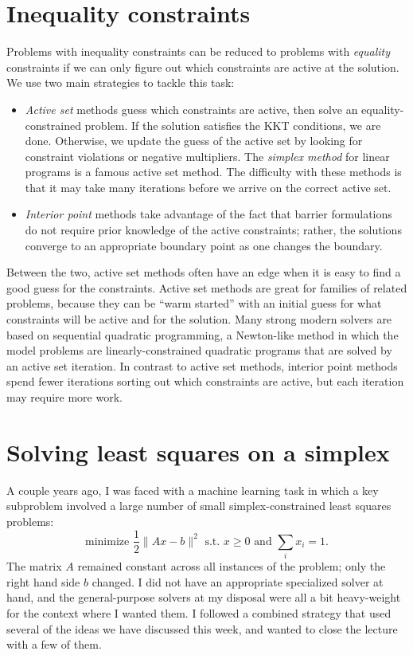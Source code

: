 \documentclass[12pt, leqno]{article} %
\begin{document}
\section*{Inequality constraints}


Problems with inequality constraints can be reduced to problems with
{\em equality} constraints if we can only figure out which constraints
are active at the solution.  We use two main strategies to tackle
this task:
\begin{itemize}
\item {\em Active set} methods guess which constraints are active, then
  solve an equality-constrained problem.  If the solution satisfies
  the KKT conditions, we are done.  Otherwise, we update the guess of
  the active set by looking for constraint violations or negative
  multipliers.  The {\em simplex method} for linear programs is a
  famous active set method.  The difficulty with these methods is that
  it may take many iterations before we arrive on the correct active set.
\item {\em Interior point} methods take advantage of the fact that
  barrier formulations do not require prior knowledge of the active
  constraints; rather, the solutions converge to an appropriate
  boundary point as one changes the boundary.
\end{itemize}
Between the two, active set methods often have an edge when it is easy
to find a good guess for the constraints.  Active set methods are
great for families of related problems, because they can be ``warm
started'' with an initial guess for what constraints will be active
and for the solution.  Many strong modern solvers are based on
sequential quadratic programming, a Newton-like method in which the
model problems are linearly-constrained quadratic programs that are
solved by an active set iteration.  In contrast to active set methods,
interior point methods spend fewer iterations sorting out which
constraints are active, but each iteration may require more work.

\section*{Solving least squares on a simplex}


A couple years ago, I was faced with a machine learning task in which
a key subproblem involved a large number of small simplex-constrained least
squares problems:
\[
  \mbox{minimize } \frac{1}{2} \|Ax-b\|^2 \mbox{ s.t. } x \geq 0
  \mbox{ and } \sum_i x_i = 1.
\]
The matrix $A$ remained constant across all instances of the problem;
only the right hand side $b$ changed.  I did not have an appropriate
specialized solver at hand, and the general-purpose solvers at my
disposal were all a bit heavy-weight for the context where I wanted
them.  I followed a combined strategy that used several of the ideas
we have discussed this week, and wanted to close the lecture with a
few of them.
\end{document}
